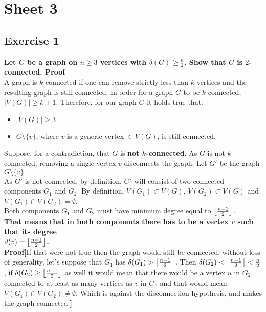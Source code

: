 \section*{Sheet 3}
\subsection*{Exercise 1}
\boldmath 
\textbf{Let $G$ be a graph on $n \geq 3$ vertices with $\delta(G) \geq \frac{n}{2}$. Show that $G$ is
$2$-connected.
\spacer
Proof} \\
\unboldmath
A graph is $k$-connected if one can remove strictly less than $k$ vertices and the resulting graph is still connected. In order for a graph $G$ to be $k$-connected, $|V(G)| \geq k + 1$. Therefore, for our graph $G$ it holds true that: 
\begin{itemize}
    \item $|V(G)| \geq 3$
    \item $G \setminus \{v\}$, where $v$ is a generic vertex $\in V(G)$, is still connected.
\end{itemize}
Suppose, for a contradiction, that $G$ \boldmath is \textbf{not $k$-connected}. \unboldmath As $G$ is not $k$-connected, removing a single vertex $v$ disconnects the graph. Let $G'$ be the graph $G\setminus \{v\}$\\
\linebreak
As $G'$ is not connected, by definition, $G'$ will consist of two connected components $G_1$ and $G_2$. By definition, $V(G_1) \subset V(G)$, $V(G_2) \subset V(G)$ and $V(G_1) \cap V(G_2) = \emptyset$.
\\ \linebreak
Both components $G_1$ and $G_2$ must have minimum degree equal to $\left\lfloor\frac{n - 1}{2}\right\rfloor$. \\
\linebreak 
\boldmath
\textbf{That means that in both components there has to be a vertex $v$ such that its degree \\ $d(v) = \left\lfloor\frac{n - 1}{2}\right\rfloor$.} \\
\unboldmath
\linebreak 
\textbf{Proof\:\:[\:\:}If that were not true then the graph would still be connected, without loss of generality, let's suppose that $G_1$ has $\delta(G_1) > \left\lfloor\frac{n - 1}{2}\right\rfloor$. Then $\delta(G_2) < \left\lfloor\frac{n - 1}{2}\right\rfloor < \frac{n}{2}$, if $\delta(G_2) \geq \left\lfloor\frac{n - 1}{2}\right\rfloor$ as well it would mean that there would be a vertex $u$ in $G_2$ connected to at least as many vertices as $v$ in $G_1$ and that would mean $V(G_1) \cap V(G_2) \neq \emptyset$. Which is against the disconnection hypothesis, and makes the graph connected.\textbf{\:\:]}\\
